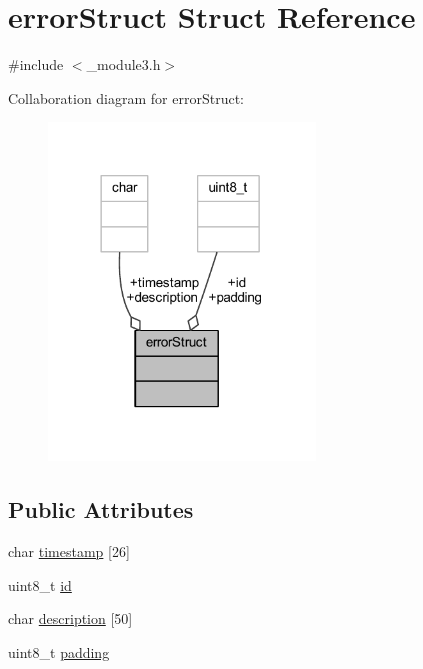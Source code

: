\hypertarget{structerror_struct}{}\section{error\+Struct Struct Reference}
\label{structerror_struct}


{\ttfamily \#include $<$\+\_\+module3.\+h$>$}



Collaboration diagram for error\+Struct\+:\nopagebreak
\begin{figure}[H]
\begin{center}
\leavevmode
\includegraphics[width=201pt]{structerror_struct__coll__graph}
\end{center}
\end{figure}
\subsection*{Public Attributes}
\begin{DoxyCompactItemize}
\item 
char \mbox{\hyperlink{structerror_struct_a51e5ae4be96680737622f257e2eb2479}{timestamp}} \mbox{[}26\mbox{]}
\item 
uint8\+\_\+t \mbox{\hyperlink{structerror_struct_af07d527b0695dad43376f6658ca6d9d3}{id}}
\item 
char \mbox{\hyperlink{structerror_struct_aed437236613db32b2b56361e2cbf3ce6}{description}} \mbox{[}50\mbox{]}
\item 
uint8\+\_\+t \mbox{\hyperlink{structerror_struct_a14bf4c23e01145e362768dfdc4466737}{padding}}
\end{DoxyCompactItemize}


